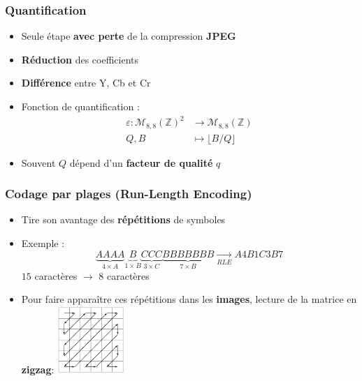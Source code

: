 \documentclass{beamer}
\begin{document}
\begin{frame}
    \frametitle{Quantification}

    \begin{itemize}
        \item Seule étape \textbf{avec perte} de la compression \textbf{JPEG}
        \item \textbf{Réduction} des coefficients
        \item \textbf{Différence} entre Y, Cb et Cr
        \item Fonction de quantification : \begin{align*}
            \varepsilon \colon \mathcal{M}_{8,8}(\mathbb{Z})^2 & \rightarrow \mathcal{M}_{8,8}(\mathbb{Z})\\
            Q, B & \longmapsto \lfloor B / Q \rfloor
        \end{align*}
        \item Souvent $Q$ dépend d'un \textbf{facteur de qualité} $q$
    \end{itemize}

\end{frame}

\begin{frame}
    \frametitle{Codage par plages (Run-Length Encoding)}

    \centering

    \begin{itemize}
        \item Tire son avantage des \textbf{répétitions} de symboles  
        \item Exemple : $$\underbrace{AAAA}_{4 \times A} \underbrace{B}_{1 \times B} \underbrace{CCC}_{3 \times C} \underbrace{BBBBBBB}_{7 \times B} \xrightarrow[RLE]{} A4B1C3B7$$
        $15$ caractères $\rightarrow$ $8$ caractères 
        \item Pour faire apparaître ces répétitions dans les \textbf{images}, lecture de la matrice en \textbf{zigzag}:
        \includegraphics[width=0.2\textwidth]{img/zigzag.png}
    \end{itemize}

\end{frame}
\end{document}
